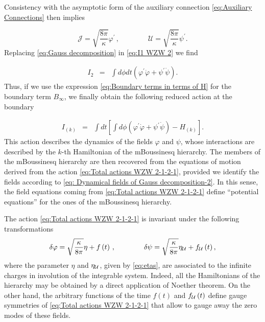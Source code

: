 \documentclass[letterpaper,11pt,oneside]{book}
\begin{document}
Consistency with the asymptotic form of the auxiliary connection \eqref{eq:Auxiliary Connections}
then implies

\begin{equation}
	\mathcal{J}=\sqrt{\frac{8\pi}{\kappa}}\varphi^{\prime}\,,\qquad\qquad\mathcal{U}=\sqrt{\frac{8\pi}{\kappa}}\psi^{\prime}.\label{eq: Dynamical fields of Gauss decomposition-2}
\end{equation}
Replacing \eqref{eq:Gauss decomposition} in \eqref{eq:I1 WZW 2}
we find

\begin{eqnarray}
	I_{2} & = & \int d\phi dt\left(\varphi^{\prime}\dot{\varphi}+\psi^{\prime}\dot{\psi}\right).\label{eq:I1 WZW 3}
\end{eqnarray}
Thus, if we use the expression \eqref{eq:Boundary terms in terms of H}
for the boundary term $B_{\infty}$, we finally obtain the following
reduced action at the boundary

\begin{eqnarray}
	I_{\left(k\right)} & = & \int dt\left[\int d\phi\left(\varphi^{\prime}\dot{\varphi}+\psi^{\prime}\dot{\psi}\right)-H_{\left(k\right)}\right].\label{eq:Total actions WZW 2-1-2-1}
\end{eqnarray}
This action describes the dynamics of the fields $\varphi$ and $\psi$,
whose interactions are described by the $k$-th Hamiltonian of the
mBoussinesq hierarchy. The members of the mBoussinesq hierarchy are
then recovered from the equations of motion derived from the action
\eqref{eq:Total actions WZW 2-1-2-1}, provided we identify the fields
according to \eqref{eq: Dynamical fields of Gauss decomposition-2}.
In this sense, the field equations coming from \eqref{eq:Total actions WZW 2-1-2-1}
define ``potential equations'' for the ones of the mBoussinesq hierarchy.

The action \eqref{eq:Total actions WZW 2-1-2-1} is invariant under
the following transformations
\[
\delta\varphi=\sqrt{\frac{\kappa}{8\pi}}\eta+f\left(t\right)\,,\qquad\qquad\delta\psi=\sqrt{\frac{\kappa}{8\pi}}\eta_{{\cal U}}+f_{{\cal U}}\left(t\right),
\]
where the parameter $\eta$ and $\eta_{{\cal U}}$, given by \eqref{eq:etas},
are associated to the infinite charges in involution of the integrable
system. Indeed, all the Hamiltonians of the hierarchy may be obtained
by a direct application of Noether theorem. On the other hand, the
arbitrary functions of the time $f\left(t\right)$ and $f_{{\cal U}}\left(t\right)$
define gauge symmetries of \eqref{eq:Total actions WZW 2-1-2-1} that
allow to gauge away the zero modes of these fields.
\end{document}
